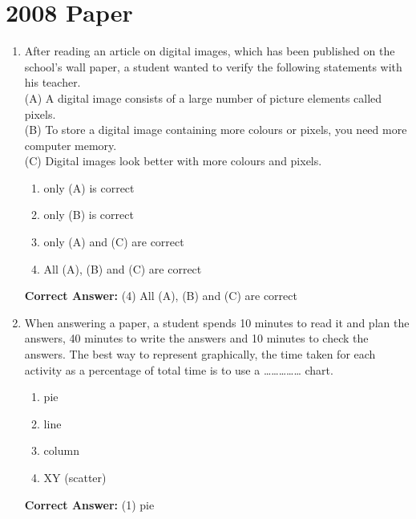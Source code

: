 \documentclass[12pt]{article}
\begin{document}
\section*{2008 Paper}
\begin{enumerate}[label=Q\arabic*:,leftmargin=*,resume]
\item After reading an article on digital images, which has been published on the school's wall paper, a student wanted to verify the following statements with his teacher.\\
(A) A digital image consists of a large number of picture elements called pixels.\\
(B) To store a digital image containing more colours or pixels, you need more computer memory.\\
(C) Digital images look better with more colours and pixels.\\
\begin{enumerate}[label=(\arabic*)]
\item only (A) is correct
\item only (B) is correct
\item only (A) and (C) are correct
\item All (A), (B) and (C) are correct
\end{enumerate}
\textbf{Correct Answer:} (4) All (A), (B) and (C) are correct

\item When answering a paper, a student spends 10 minutes to read it and plan the answers, 40 minutes to write the answers and 10 minutes to check the answers. The best way to represent graphically, the time taken for each activity as a percentage of total time is to use a …………… chart.\\
\begin{enumerate}[label=(\arabic*)]
\item pie
\item line
\item column
\item XY (scatter)
\end{enumerate}
\textbf{Correct Answer:} (1) pie
\end{enumerate}

\end{document}
